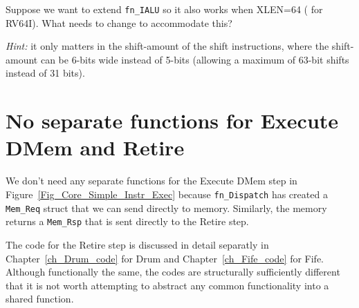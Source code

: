 Suppose we want to extend {\tt fn\_IALU} so it also works when XLEN=64
({\ie} for RV64I).  What needs to change to accommodate this?

\emph{Hint:} it only matters in the shift-amount of the shift
instructions, where the shift-amount can be 6-bits wide instead of
5-bits (allowing a maximum of 63-bit shifts instead of 31 bits).

\Endexercise


\section{No separate functions for Execute DMem and Retire}

We don't need any separate functions for the Execute DMem step in
Figure~\ref{Fig_Core_Simple_Instr_Exec} because \verb|fn_Dispatch| has
created a \verb|Mem_Req| struct that we can send directly to memory.
Similarly, the memory returns a \verb|Mem_Rsp| that is sent directly
to the Retire step.

The code for the Retire step is discussed in detail separatly in
Chapter~\ref{ch_Drum_code} for Drum and Chapter~\ref{ch_Fife_code} for
Fife.  Although functionally the same, the codes are structurally
sufficiently different that it is not worth attempting to abstract any
common functionality into a shared function.

